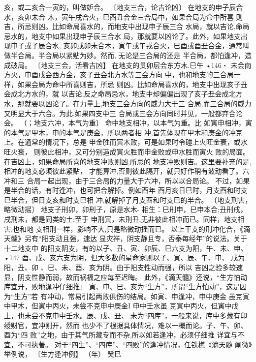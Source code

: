 亥，或二亥合一寅的，叫做妒合。
〔地支三合，论吉论凶〕 在地支的申子辰合水，亥卯未合
木，寅午戌合火，巳酉丑合金三合局中，如果合局为命中所喜
则吉，所忌则凶。比如命局喜水的，而地支中出现申子辰三合
水局，就以吉论,命局忌水的，地支中如果出现申子辰三合水
局，那就要以凶论了。此外，如果地支出现申子或子辰合水,
亥卯或卯未合木，寅午或午戎合火，巳酉或酉丑合金，通常叫
做半合局。半合局以紧贴为妙。然而, 无论是三合局的还是
半合局，都怕逢冲，造成破局。
〔地支三会，活看吉凶】 在地支的贯卯层会东方木.巳午
•146・
未会南方火，申酉戌会西方金，亥子丑会北方水等三会方向
中，也和地支的三合局一样，如果会局为命中所喜则吉，所忌
则凶。比如命局喜水的，地支中出现亥子丑会成北方水的，就
以吉论;反之命局忌水，地支中却偏偏出现了亥子丑会成北方
水，那就要以凶论了。在力量上,地支三会方向的威力大于三
合局,而三合局的威力又明显大于六合。为此,如果四支中三
合局或三会方向同时并见，一般都弃合论会。
（；地支六冲，本气为重〕 命中地支相冲，以本气为重。比
如寅申相冲，寅的本气是甲木，申的本气是庚金，所以两者相
冲,首先体现在甲木和庚金的冲克上。在通常的情况下，总是
申金胜而寅木败，可是如果时令碰上火旺金衰，或水旺火衰，
则彼此相冲，又可分别造成寅火胜而申金败或申水胜而寅火
败的局面。在吉凶上，如果命局所喜的地支冲败则凶,所忌的
地支冲败则吉。这里要补充的是,相冲的地支必须彼此紧贴，
才能算冲,否则彼此隔开，就只好作稍有波动看了。六冲和三
合局一起出现，由于三合局的力量大于六冲，所以以合局论。
不过，如果是半合的话，有时逢冲，也可把合解掉。例如酉年
酉月亥日巳时，月支酉和时支巳半合，但日支亥和时支巳相
冲,就解掉了月支酉和时支巳的半合。
〔地支刑害，略微动摇〕 地支子刑卯，卯刑子，原是水木- 相生：巳刑申，巳申本合;丑刑戌，戌刑未，都是同类的土;至于
申刑寅，未刑丑,无非彼此相冲而已。同样，地支相害,也和地
支相刑一样，影响不大,只是略微动摇而已。
以上干支的刑冲化合，《滴天髓》另有*阳支动且强，速达
显灾祥，阴支静且专，否泰每经年”的说法。关于十二地支中
的阳支阴支，有的以子、丑、寅、卯辰、巳六支为阳，午、未、申、
•147
酉、戌、亥六支为阴，但大多数的星命家则以子、寅、辰、午、申、
戌为阳，丑、卯 、巳、未、酉、亥为阴。由于阳支性动而强，所以
吉凶之验多较速显，阴支性静而弱，故而祸福之应每至迟晦。
此外，《滴天髓》还说，“生方怕动库宜开，败地逢冲仔细推」
寅、申、巳、亥为“生方”，所谓“生方怕动”，这是因为“生方”若
有冲动，常易引起两败俱伤的结局。如寅、申逢冲，申中庚金
虽克寅中甲木，但寅中丙火，未尝不克申中庚金I 申中壬水虽
克寅中丙火，但寅中戊土，也未尝不克申中壬水。辰、戌、丑、
未为“四库”，一般来说，库中多藏有印绶财官，宜冲则开，然而
也少不了根据具体情况，难以一概而论。子、午、卯、酉为“四
败”之地，由于其气所藏专而不杂,所以如若逢冲，必须仔细推
详宜与不宜，不可执著。
对于“四生”、“四库”、“四败”的逢冲情况，任铁樵《滴天髓
阐微》举例说，
〔生方逢冲例】
（年） 癸巳
